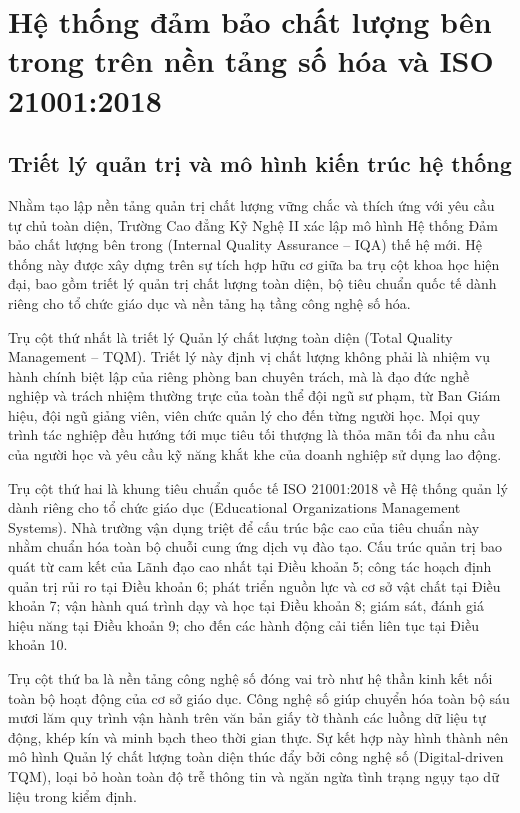 \section{Hệ thống đảm bảo chất lượng bên trong trên nền tảng số hóa và ISO 21001:2018}

\subsection{Triết lý quản trị và mô hình kiến trúc hệ thống}

Nhằm tạo lập nền tảng quản trị chất lượng vững chắc và thích ứng với yêu cầu tự chủ toàn diện, Trường Cao đẳng Kỹ Nghệ II xác lập mô hình Hệ thống Đảm bảo chất lượng bên trong (Internal Quality Assurance -- IQA) thế hệ mới. Hệ thống này được xây dựng trên sự tích hợp hữu cơ giữa ba trụ cột khoa học hiện đại, bao gồm triết lý quản trị chất lượng toàn diện, bộ tiêu chuẩn quốc tế dành riêng cho tổ chức giáo dục và nền tảng hạ tầng công nghệ số hóa.

Trụ cột thứ nhất là triết lý Quản lý chất lượng toàn diện (Total Quality Management -- TQM). Triết lý này định vị chất lượng không phải là nhiệm vụ hành chính biệt lập của riêng phòng ban chuyên trách, mà là đạo đức nghề nghiệp và trách nhiệm thường trực của toàn thể đội ngũ sư phạm, từ Ban Giám hiệu, đội ngũ giảng viên, viên chức quản lý cho đến từng người học. Mọi quy trình tác nghiệp đều hướng tới mục tiêu tối thượng là thỏa mãn tối đa nhu cầu của người học và yêu cầu kỹ năng khắt khe của doanh nghiệp sử dụng lao động.

Trụ cột thứ hai là khung tiêu chuẩn quốc tế ISO 21001:2018 về Hệ thống quản lý dành riêng cho tổ chức giáo dục (Educational Organizations Management Systems). Nhà trường vận dụng triệt để cấu trúc bậc cao của tiêu chuẩn này nhằm chuẩn hóa toàn bộ chuỗi cung ứng dịch vụ đào tạo. Cấu trúc quản trị bao quát từ cam kết của Lãnh đạo cao nhất tại Điều khoản 5; công tác hoạch định quản trị rủi ro tại Điều khoản 6; phát triển nguồn lực và cơ sở vật chất tại Điều khoản 7; vận hành quá trình dạy và học tại Điều khoản 8; giám sát, đánh giá hiệu năng tại Điều khoản 9; cho đến các hành động cải tiến liên tục tại Điều khoản 10.

Trụ cột thứ ba là nền tảng công nghệ số đóng vai trò như hệ thần kinh kết nối toàn bộ hoạt động của cơ sở giáo dục. Công nghệ số giúp chuyển hóa toàn bộ sáu mươi lăm quy trình vận hành trên văn bản giấy tờ thành các luồng dữ liệu tự động, khép kín và minh bạch theo thời gian thực. Sự kết hợp này hình thành nên mô hình Quản lý chất lượng toàn diện thúc đẩy bởi công nghệ số (Digital-driven TQM), loại bỏ hoàn toàn độ trễ thông tin và ngăn ngừa tình trạng ngụy tạo dữ liệu trong kiểm định.


